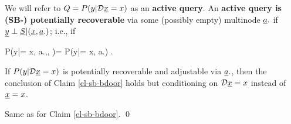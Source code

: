 We will refer to $Q=P(y|\cald \rvx=x)$ 
as an {\bf  active query}.
An {\bf active query is
(SB-) potentially recoverable}
via some (possibly empty) multinode $\rva.$ if $\rvy\perp\rvS|(\rvx, \rva.)$; i.e., if

\beq
P(y|\cald \rvx = x, a.,\beta, )=
P(y|\cald \rvx = x, a.)
\;.
\eeq
%


\begin{claim} If $P(y|\cald \rvx=x)$ is potentially 
recoverable and adjustable via $\rva.$, then 
the conclusion of Claim \ref{cl-sb-bdoor} holds
but conditioning on $\cald\rvx=x$ instead of $\rvx=x$.
\end{claim}
\proof
Same as for Claim \ref{cl-sb-bdoor}.
\qed
                                      
